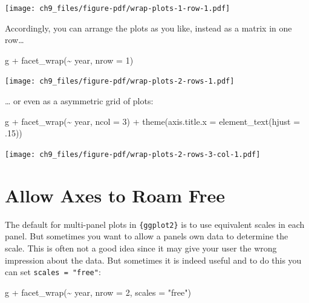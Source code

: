 \documentclass[
  letterpaper,
  DIV=11,
  numbers=noendperiod]{scrreprt}
\newenvironment{Shaded}{\begin{snugshade}}{\end{snugshade}}
\newcommand{\AttributeTok}[1]{\textcolor[rgb]{0.40,0.45,0.13}{#1}}
\newcommand{\DecValTok}[1]{\textcolor[rgb]{0.68,0.00,0.00}{#1}}
\newcommand{\FunctionTok}[1]{\textcolor[rgb]{0.28,0.35,0.67}{#1}}
\newcommand{\NormalTok}[1]{\textcolor[rgb]{0.00,0.23,0.31}{#1}}
\newcommand{\SpecialCharTok}[1]{\textcolor[rgb]{0.37,0.37,0.37}{#1}}
\newcommand{\StringTok}[1]{\textcolor[rgb]{0.13,0.47,0.30}{#1}}
\begin{document}
\texttt{[image: ch9\_files/figure-pdf/wrap-plots-1-row-1.pdf]}

Accordingly, you can arrange the plots as you like, instead as a matrix
in one row\ldots{}

\begin{Shaded}
\begin{Highlighting}[]
\NormalTok{g }\SpecialCharTok{+} \FunctionTok{facet\_wrap}\NormalTok{(}\SpecialCharTok{\textasciitilde{}}\NormalTok{ year, }\AttributeTok{nrow =} \DecValTok{1}\NormalTok{)}
\end{Highlighting}
\end{Shaded}

\texttt{[image: ch9\_files/figure-pdf/wrap-plots-2-rows-1.pdf]}

\ldots{} or even as a asymmetric grid of plots:

\begin{Shaded}
\begin{Highlighting}[]
\NormalTok{g }\SpecialCharTok{+} \FunctionTok{facet\_wrap}\NormalTok{(}\SpecialCharTok{\textasciitilde{}}\NormalTok{ year, }\AttributeTok{ncol =} \DecValTok{3}\NormalTok{) }\SpecialCharTok{+} \FunctionTok{theme}\NormalTok{(}\AttributeTok{axis.title.x =} \FunctionTok{element\_text}\NormalTok{(}\AttributeTok{hjust =}\NormalTok{ .}\DecValTok{15}\NormalTok{))}
\end{Highlighting}
\end{Shaded}

\texttt{[image: ch9\_files/figure-pdf/wrap-plots-2-rows-3-col-1.pdf]}

\section{Allow Axes to Roam Free}\label{allow-axes-to-roam-free}

The default for multi-panel plots in \texttt{\{ggplot2\}} is to use
equivalent scales in each panel. But sometimes you want to allow a
panels own data to determine the scale. This is often not a good idea
since it may give your user the wrong impression about the data. But
sometimes it is indeed useful and to do this you can set
\texttt{scales\ =\ "free"}:

\begin{Shaded}
\begin{Highlighting}[]
\NormalTok{g }\SpecialCharTok{+} \FunctionTok{facet\_wrap}\NormalTok{(}\SpecialCharTok{\textasciitilde{}}\NormalTok{ year, }\AttributeTok{nrow =} \DecValTok{2}\NormalTok{, }\AttributeTok{scales =} \StringTok{"free"}\NormalTok{)}
\end{Highlighting}
\end{Shaded}
\end{document}
